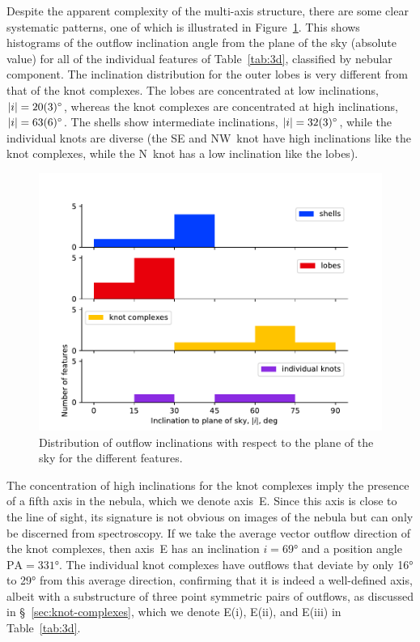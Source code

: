 \documentclass[useAMS, usenatbib]{mnras}
\begin{document}
Despite the apparent complexity of the multi-axis structure, there are some clear systematic patterns,
one of which is illustrated in Figure~\ref{fig:inclinations}.
This shows histograms of the outflow inclination angle from the plane of the sky (absolute value)
for all of the individual features of Table~\ref{tab:3d}, classified by nebular component.
The inclination distribution for the outer lobes is very different from that of the knot complexes.
The lobes are concentrated at low inclinations, \(|i| = \ang{20 \pm 3}\),
whereas the knot complexes are concentrated at high inclinations, \(|i| = \ang{63 \pm 6}\).
The shells show intermediate inclinations, \(|i| = \ang{32 \pm 3}\),
while the individual knots are diverse
(the SE and NW~knot have high inclinations like the knot complexes,
while the N~knot has a low inclination like the lobes). 


\begin{figure}
  \centering
  \includegraphics[width=\linewidth]{figs/turtle-inclination-histogram}
  \caption{Distribution of outflow inclinations with respect to the plane of the sky for the different features.}
  \label{fig:inclinations}
\end{figure}

The concentration of high inclinations for the knot complexes imply the presence of a fifth axis in the nebula, which we denote axis~E.
Since this axis is close to the line of sight,
its signature is not obvious on images of the nebula but can only be discerned from spectroscopy.
If we take the average vector outflow direction of the knot complexes,
then axis~E has an inclination \(i = \ang{69}\)
and a position angle \(\mathrm{PA} = \ang{331}\).
The individual knot complexes have outflows that deviate by only \ang{16} to \ang{29} from this average direction,
confirming that it is indeed a well-defined axis,
albeit with a substructure of three point symmetric pairs of outflows,
as discussed in \S~\ref{sec:knot-complexes},
which we denote E(i), E(ii), and E(iii) in Table~\ref{tab:3d}.
\end{document}
